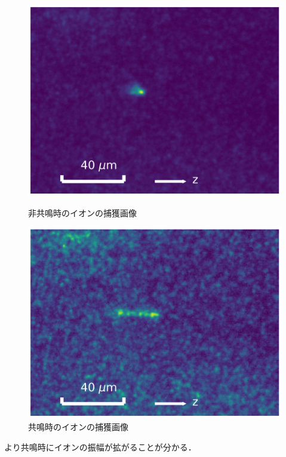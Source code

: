 \begin{figure}[h]
		\begin{minipage}{0.48\linewidth}
			\centering
			\includegraphics[width = 0.6\columnwidth]{./methods/figure/off_resonance.jpg}
			\caption{非共鳴時のイオンの捕獲画像}
			\label{fig:example_off_resonance}
		\end{minipage}
		\begin{minipage}{0.48\linewidth}
			\centering
			\includegraphics[width = 0.6\columnwidth]{./methods/figure/resonance.jpg}
			\caption{共鳴時のイオンの捕獲画像}
			\label{fig:example_resonance}
		\end{minipage}
\end{figure}

より共鳴時にイオンの振幅が拡がることが分かる．

\clearpage

